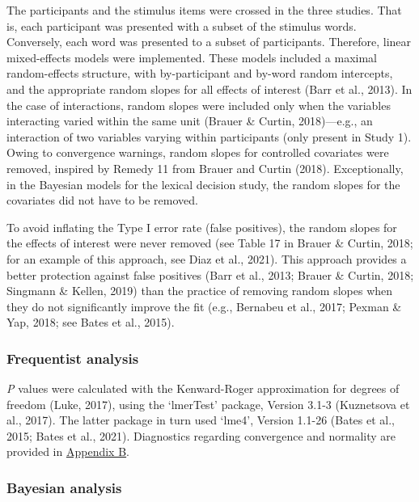 \documentclass[
  12pt,
  man,floatsintext]{apa7}
\begin{document}
The participants and the stimulus items were crossed in the three studies. That is, each participant was presented with a subset of the stimulus words. Conversely, each word was presented to a subset of participants. Therefore, linear mixed-effects models were implemented. These models included a maximal random-effects structure, with by-participant and by-word random intercepts, and the appropriate random slopes for all effects of interest (Barr et al., 2013). In the case of interactions, random slopes were included only when the variables interacting varied within the same unit (Brauer \& Curtin, 2018)---e.g., an interaction of two variables varying within participants (only present in Study 1). Owing to convergence warnings, random slopes for controlled covariates were removed, inspired by Remedy 11 from Brauer and Curtin (2018). Exceptionally, in the Bayesian models for the lexical decision study, the random slopes for the covariates did not have to be removed.

To avoid inflating the Type I error rate (false positives), the random slopes for the effects of interest were never removed (see Table 17 in Brauer \& Curtin, 2018; for an example of this approach, see Diaz et al., 2021). This approach provides a better protection against false positives (Barr et al., 2013; Brauer \& Curtin, 2018; Singmann \& Kellen, 2019) than the practice of removing random slopes when they do not significantly improve the fit (e.g., Bernabeu et al., 2017; Pexman \& Yap, 2018; see Bates et al., 2015).

\hypertarget{frequentist-analysis}{%
\subsubsection{Frequentist analysis}\label{frequentist-analysis}}

\emph{P} values were calculated with the Kenward-Roger approximation for degrees of freedom (Luke, 2017), using the `lmerTest' package, Version 3.1-3 (Kuznetsova et al., 2017). The latter package in turn used `lme4', Version 1.1-26 (Bates et al., 2015; Bates et al., 2021). Diagnostics regarding convergence and normality are provided in \protect\hyperlink{appendix-B-frequentist-analysis-diagnostics}{\underline{Appendix B}}.

\hypertarget{bayesian-analysis}{%
\subsubsection{Bayesian analysis}\label{bayesian-analysis}}
\end{document}
